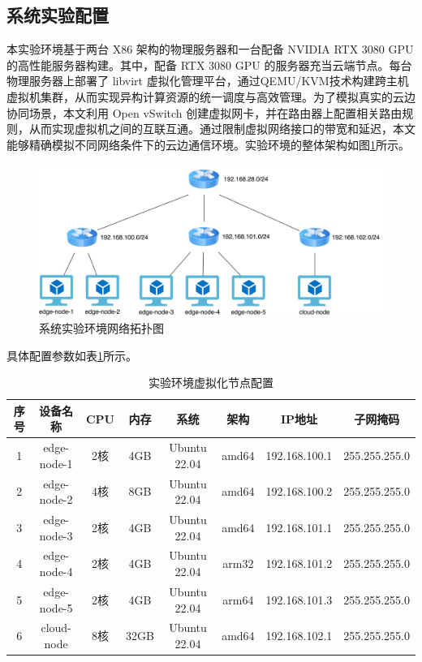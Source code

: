 \subsection{系统实验配置}

本实验环境基于两台 X86 架构的物理服务器和一台配备 NVIDIA RTX 3080 GPU 的高性能服务器构建。其中，配备 RTX 3080 GPU 的服务器充当云端节点。每台物理服务器上部署了 libvirt 虚拟化管理平台，通过QEMU/KVM技术构建跨主机虚拟机集群，从而实现异构计算资源的统一调度与高效管理。为了模拟真实的云边协同场景，本文利用 Open vSwitch 创建虚拟网卡，并在路由器上配置相关路由规则，从而实现虚拟机之间的互联互通。通过限制虚拟网络接口的带宽和延迟，本文能够精确模拟不同网络条件下的云边通信环境。实验环境的整体架构如图\ref{fig:5-1all}所示。

\begin{figure}[ht]
  \centering
  \includegraphics[width=\linewidth]{pics/5-1all.png}
  \caption{系统实验环境网络拓扑图}
  \label{fig:5-1all}
\end{figure}

具体配置参数如表\ref{tab:vm-configurations}所示。

\begin{table}[ht]
    \centering
    \renewcommand{\arraystretch}{1.2}
    \caption{实验环境虚拟化节点配置}
    \label{tab:vm-configurations}
    \begin{tabular}{cccccccc}
        \toprule
        \textbf{序号} & \textbf{设备名称} & \textbf{CPU} & \textbf{内存} & \textbf{系统} & \textbf{架构} & \textbf{IP地址} & \textbf{子网掩码} \\
        \midrule
        1 & edge-node-1 & 2核 & 4GB & Ubuntu 22.04 & amd64 & 192.168.100.1 & 255.255.255.0 \\
        2 & edge-node-2 & 4核 & 8GB & Ubuntu 22.04 & amd64 & 192.168.100.2 & 255.255.255.0 \\
        3 & edge-node-3 & 2核 & 4GB & Ubuntu 22.04 & amd64 & 192.168.101.1 & 255.255.255.0 \\
        4 & edge-node-4 & 2核 & 4GB & Ubuntu 22.04 & arm32 & 192.168.101.2 & 255.255.255.0 \\
        5 & edge-node-5 & 2核 & 4GB & Ubuntu 22.04 & arm64 & 192.168.101.3 & 255.255.255.0 \\
        6 & cloud-node & 8核 & 32GB & Ubuntu 22.04 & amd64 & 192.168.102.1 & 255.255.255.0 \\
        \bottomrule
    \end{tabular}
    \vspace{6pt}
\end{table}

